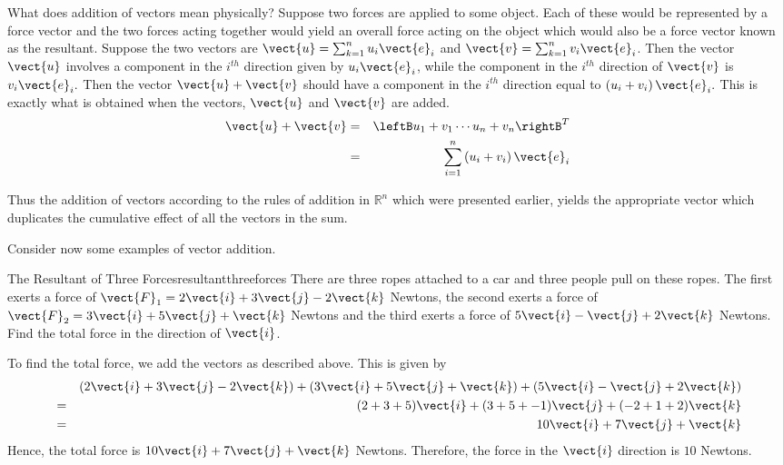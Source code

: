 What does addition of vectors mean physically? Suppose two forces are
applied to some object. Each of these would be represented by a force vector
and the two forces acting together would yield an overall force acting on
the object which would also be a force vector known as the
 resultant. Suppose the two vectors are $\vect{u}=\sum_{k=1}^{n}u_{i}\vect{e}_{i}$ and $\vect{v}=\sum_{k=1}^{n}v_{i}\vect{e}_{i}$. Then the vector $\vect{u}$ involves a component in the $
i^{th}$ direction given by $u_{i}\vect{e}_{i}$, while the component in the $i^{th}$
direction of $\vect{v}$ is $v_{i}\vect{e}_{i}.$ Then the vector $\vect{u} + \vect{v}$ should have a component in the $i^{th}$
direction equal to $\left( u_{i}+v_{i}\right) \vect{e}_{i}.$ This is
exactly what is obtained when the vectors, $\vect{u}$ and $\vect{v}$ are
added.
\begin{eqnarray*}
\vect{u}+\vect{v}& =&\leftB u_{1}+v_{1} \cdots u_{n}+v_{n}\rightB^T  \\
& =&\sum_{i=1}^{n}\left( u_{i}+v_{i}\right) \vect{e}_{i}
\end{eqnarray*}

Thus the addition of vectors according to the rules of addition in $\mathbb{R
}^{n}$ which were presented earlier, yields the appropriate vector which
duplicates the cumulative effect of all the vectors in the sum.

Consider now some examples of vector addition.

\begin{example}{The Resultant of Three Forces}{resultantthreeforces}
There are three ropes attached to a car and three people pull on these
ropes. The first exerts a force of $\vect{F}_1 = 
2\vect{i} + 3\vect{j} -2 \vect{k}$ Newtons, the second exerts a force of $\vect{F}_2
=
3\vect{i}+5\vect{j}+\vect{k}$ Newtons
and the third exerts a force of $5\vect{i}-\vect{j}+2\vect{k}$ Newtons. Find
the total force in the direction of $\vect{i}$.
\end{example}

\begin{solution}
To find the total force, we add the vectors as described above. 
This is given by 
\begin{eqnarray*}
&&(2\vect{i}+3\vect{j}-2\vect{k}) + (3\vect{i}+5\vect{j}+\vect{k}) + (5\vect{i}-\vect{j}+2\vect{k})\\
&=&
(2  + 3 + 5) \vect{i} + (3 + 5 + -1) \vect{j} + (-2+1+2) \vect{k} \\
&=&
10 \vect{i} + 7 \vect{j} + \vect{k}
\end{eqnarray*}
Hence, the total force is  $10\vect{i}+7\vect{j}+\vect{k}$ Newtons. Therefore, the force in the $
\vect{i}$ direction is $10$ Newtons.
\end{solution}

